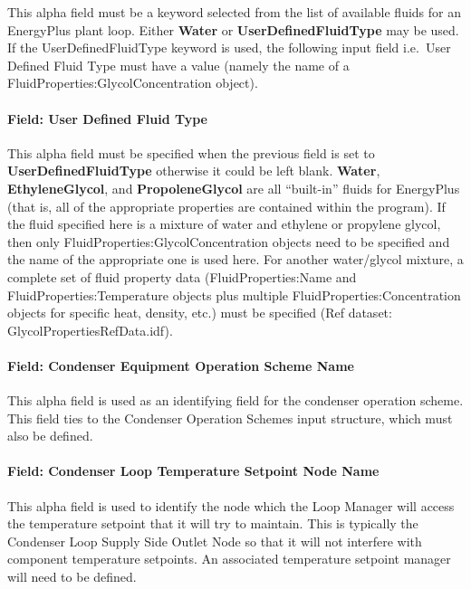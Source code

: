 This alpha field must be a keyword selected from the list of available fluids for an EnergyPlus plant loop. Either \textbf{Water} or \textbf{UserDefinedFluidType} may be used. If the UserDefinedFluidType keyword is used, the following input field i.e.~User Defined Fluid Type must have a value (namely the name of a FluidProperties:GlycolConcentration object).

\paragraph{Field: User Defined Fluid Type}\label{field-user-defined-fluid-type-1}

This alpha field must be specified when the previous field is set to \textbf{UserDefinedFluidType} otherwise it could be left blank. \textbf{Water}, \textbf{EthyleneGlycol}, and \textbf{PropoleneGlycol} are all ``built-in'' fluids for EnergyPlus (that is, all of the appropriate properties are contained within the program). If the fluid specified here is a mixture of water and ethylene or propylene glycol, then only FluidProperties:GlycolConcentration objects need to be specified and the name of the appropriate one is used here. For another water/glycol mixture, a complete set of fluid property data (FluidProperties:Name and FluidProperties:Temperature objects plus multiple FluidProperties:Concentration objects for specific heat, density, etc.) must be specified (Ref dataset: GlycolPropertiesRefData.idf).

\paragraph{Field: Condenser Equipment Operation Scheme Name}\label{field-condenser-equipment-operation-scheme-name}

This alpha field is used as an identifying field for the condenser operation scheme. This field ties to the Condenser Operation Schemes input structure, which must also be defined.

\paragraph{Field: Condenser Loop Temperature Setpoint Node Name}\label{field-condenser-loop-temperature-setpoint-node-name}

This alpha field is used to identify the node which the Loop Manager will access the temperature setpoint that it will try to maintain. This is typically the Condenser Loop Supply Side Outlet Node so that it will not interfere with component temperature setpoints. An associated temperature setpoint manager will need to be defined.

